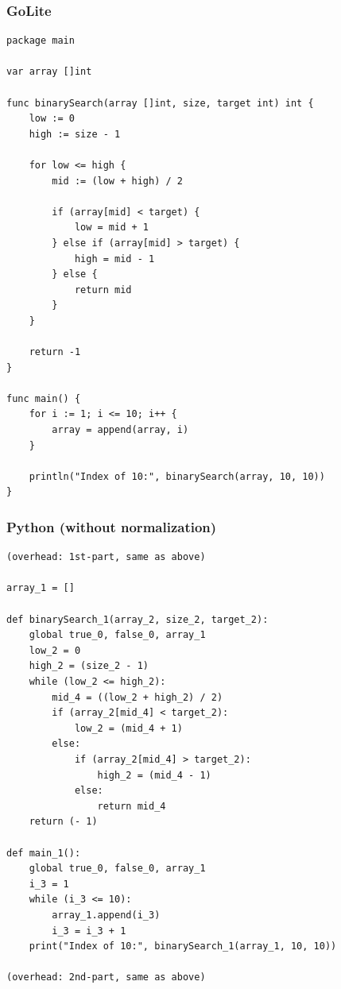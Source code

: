 \documentclass{article}
\begin{document}
\subsubsection{GoLite}

\begin{lstlisting}
package main

var array []int

func binarySearch(array []int, size, target int) int {
    low := 0
    high := size - 1

    for low <= high {
        mid := (low + high) / 2
        
        if (array[mid] < target) {
            low = mid + 1
        } else if (array[mid] > target) {
            high = mid - 1
        } else {
            return mid
        }
    }

    return -1
}

func main() {
    for i := 1; i <= 10; i++ {
        array = append(array, i)
    }

    println("Index of 10:", binarySearch(array, 10, 10))
}
\end{lstlisting}

\subsubsection{Python (without normalization)}

\begin{lstlisting}
(overhead: 1st-part, same as above)

array_1 = []

def binarySearch_1(array_2, size_2, target_2):
	global true_0, false_0, array_1
	low_2 = 0
	high_2 = (size_2 - 1)
	while (low_2 <= high_2):
		mid_4 = ((low_2 + high_2) / 2)
		if (array_2[mid_4] < target_2):
			low_2 = (mid_4 + 1)
		else:
			if (array_2[mid_4] > target_2):
				high_2 = (mid_4 - 1)
			else:
				return mid_4
	return (- 1)

def main_1():
	global true_0, false_0, array_1
	i_3 = 1
	while (i_3 <= 10):
		array_1.append(i_3)
		i_3 = i_3 + 1
	print("Index of 10:", binarySearch_1(array_1, 10, 10))

(overhead: 2nd-part, same as above)
\end{lstlisting}
\end{document}
